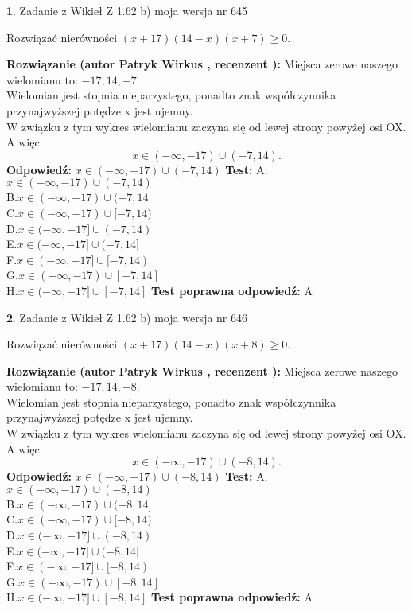 \documentclass[12pt, a4paper]{article}
\theoremstyle{definition} %
\newtheorem{zad}{}
\newcommand{\zadStart}[1]{\begin{zad}#1\newline}
\newcommand{\zadStop}{\end{zad}}
\newcommand{\rozwStart}[2]{\noindent \textbf{Rozwiązanie (autor #1 , recenzent #2): }\newline}
\newcommand{\rozwStop}{\newline}
\newcommand{\odpStart}{\noindent \textbf{Odpowiedź:}\newline}
\newcommand{\odpStop}{\newline}
\newcommand{\testStart}{\noindent \textbf{Test:}\newline}
\newcommand{\testStop}{\newline}
\newcommand{\kluczStart}{\noindent \textbf{Test poprawna odpowiedź:}\newline}
\newcommand{\kluczStop}{\newline}
\begin{document}
\zadStart{Zadanie z Wikieł Z 1.62 b) moja wersja nr 645}

Rozwiązać nierówności $(x+17)(14-x)(x+7)\ge0$.
\zadStop
\rozwStart{Patryk Wirkus}{}
Miejsca zerowe naszego wielomianu to: $-17, 14, -7$.\\
Wielomian jest stopnia nieparzystego, ponadto znak współczynnika przy\linebreak najwyższej potędze x jest ujemny.\\ W związku z tym wykres wielomianu zaczyna się od lewej strony powyżej osi OX. A więc $$x \in (-\infty,-17) \cup (-7,14).$$
\rozwStop
\odpStart
$x \in (-\infty,-17) \cup (-7,14)$
\odpStop
\testStart
A.$x \in (-\infty,-17) \cup (-7,14)$\\
B.$x \in (-\infty,-17) \cup (-7,14]$\\
C.$x \in (-\infty,-17) \cup [-7,14)$\\
D.$x \in (-\infty,-17] \cup (-7,14)$\\
E.$x \in (-\infty,-17] \cup (-7,14]$\\
F.$x \in (-\infty,-17] \cup [-7,14)$\\
G.$x \in (-\infty,-17) \cup [-7,14]$\\
H.$x \in (-\infty,-17] \cup [-7,14]$
\testStop
\kluczStart
A
\kluczStop



\zadStart{Zadanie z Wikieł Z 1.62 b) moja wersja nr 646}

Rozwiązać nierówności $(x+17)(14-x)(x+8)\ge0$.
\zadStop
\rozwStart{Patryk Wirkus}{}
Miejsca zerowe naszego wielomianu to: $-17, 14, -8$.\\
Wielomian jest stopnia nieparzystego, ponadto znak współczynnika przy\linebreak najwyższej potędze x jest ujemny.\\ W związku z tym wykres wielomianu zaczyna się od lewej strony powyżej osi OX. A więc $$x \in (-\infty,-17) \cup (-8,14).$$
\rozwStop
\odpStart
$x \in (-\infty,-17) \cup (-8,14)$
\odpStop
\testStart
A.$x \in (-\infty,-17) \cup (-8,14)$\\
B.$x \in (-\infty,-17) \cup (-8,14]$\\
C.$x \in (-\infty,-17) \cup [-8,14)$\\
D.$x \in (-\infty,-17] \cup (-8,14)$\\
E.$x \in (-\infty,-17] \cup (-8,14]$\\
F.$x \in (-\infty,-17] \cup [-8,14)$\\
G.$x \in (-\infty,-17) \cup [-8,14]$\\
H.$x \in (-\infty,-17] \cup [-8,14]$
\testStop
\kluczStart
A
\kluczStop
\end{document}
